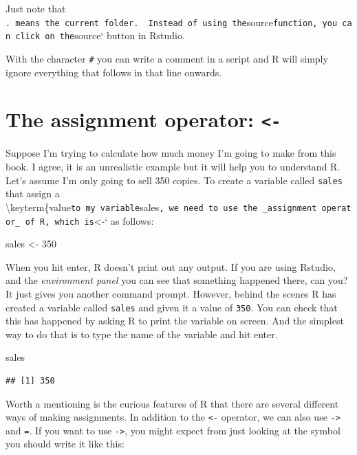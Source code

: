 \documentclass[
  12pt,
  oneside]{book}
\newenvironment{Shaded}{\begin{snugshade}}{\end{snugshade}}
\newcommand{\DecValTok}[1]{\textcolor[rgb]{0.00,0.00,0.81}{#1}}
\newcommand{\NormalTok}[1]{#1}
\newcommand{\OtherTok}[1]{\textcolor[rgb]{0.56,0.35,0.01}{#1}}
\begin{document}
Just note that \texttt{.\textquotesingle{}\ means\ the\ current\ folder.\ \ Instead\ of\ using\ the}source\texttt{function,\ you\ can\ click\ on\ the}source` button in Rstudio.

With the character \texttt{\#} you can write a comment in a script and R will simply ignore everything that follows in that line onwards.

\hypertarget{sec:assignmentoper}{%
\section{\texorpdfstring{The assignment operator: \texttt{\textless{}-}}{The assignment operator: \textless-}}\label{sec:assignmentoper}}

Suppose I'm trying to calculate how much money I'm going to make from this book. I agree, it is an unrealistic example but it will help you to understand R.
Let's assume I'm only going to sell 350 copies. To create a variable called \texttt{sales} that assign a \textbackslash keyterm\{value\texttt{to\ my\ variable}sales\texttt{,\ we\ need\ to\ use\ the\ \_assignment\ operator\_\ of\ R,\ which\ is}\textless-` as follows:

\begin{Shaded}
\begin{Highlighting}[]
\NormalTok{sales }\OtherTok{\textless{}{-}} \DecValTok{350}
\end{Highlighting}
\end{Shaded}

When you hit enter, R doesn't print out any output. If you are using Rstudio, and the \emph{environment panel} you can see that something happened there, can you? It just gives you another command prompt. However, behind the scenes R has created a variable called \texttt{sales} and given it a value of \texttt{350}. You can check that this has happened by asking R to print the variable on screen. And the simplest way to do that is to type the name of the variable and hit enter.

\begin{Shaded}
\begin{Highlighting}[]
\NormalTok{sales}
\end{Highlighting}
\end{Shaded}

\begin{verbatim}
## [1] 350
\end{verbatim}

Worth a mentioning is the curious features of R that there are several different ways of making assignments. In addition to the \texttt{\textless{}-} operator, we can also use \texttt{-\textgreater{}} and \texttt{=}. If you want to use \texttt{-\textgreater{}}, you might expect from just looking at the symbol you should write it like this:
\end{document}
